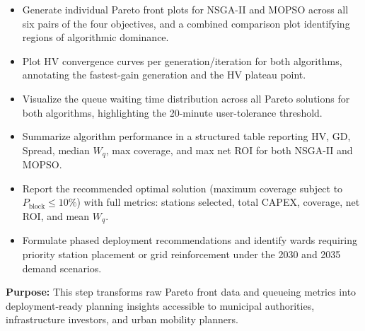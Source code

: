 \begin{itemize}
    \item Generate individual Pareto front plots for NSGA-II and
          MOPSO across all six pairs of the four objectives, and
          a combined comparison plot identifying regions of
          algorithmic dominance.
    \item Plot HV convergence curves per generation/iteration for
          both algorithms, annotating the fastest-gain generation
          and the HV plateau point.
    \item Visualize the queue waiting time distribution across
          all Pareto solutions for both algorithms, highlighting
          the 20-minute user-tolerance threshold.
    \item Summarize algorithm performance in a structured table
          reporting HV, GD, Spread, median $W_q$, max coverage,
          and max net ROI for both NSGA-II and MOPSO.
    \item Report the recommended optimal solution (maximum
          coverage subject to $P_{\text{block}} \leq 10\%$) with
          full metrics: stations selected, total CAPEX, coverage,
          net ROI, and mean $W_q$.
    \item Formulate phased deployment recommendations and identify
          wards requiring priority station placement or grid
          reinforcement under the 2030 and 2035 demand scenarios.
\end{itemize}

\noindent\textbf{Purpose:} This step transforms raw Pareto front
data and queueing metrics into deployment-ready planning insights
accessible to municipal authorities, infrastructure investors,
and urban mobility planners.